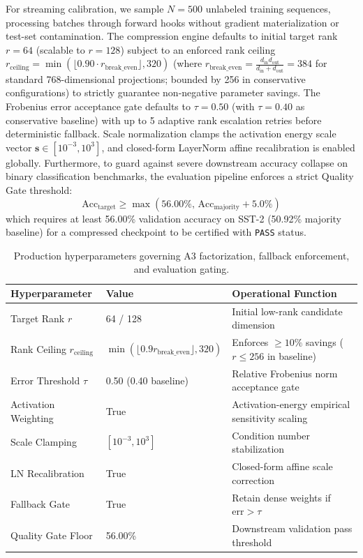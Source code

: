 For streaming calibration, we sample $N = 500$ unlabeled training sequences, processing batches through forward hooks without gradient materialization or test-set contamination. The compression engine defaults to initial target rank $r = 64$ (scalable to $r=128$) subject to an enforced rank ceiling $r_{\mathrm{ceiling}} = \min(\lfloor 0.90 \cdot r_{\mathrm{break\_even}}\rfloor, 320)$ (where $r_{\mathrm{break\_even}} = \frac{d_{\mathrm{in}} d_{\mathrm{out}}}{d_{\mathrm{in}} + d_{\mathrm{out}}} = 384$ for standard 768-dimensional projections; bounded by 256 in conservative configurations) to strictly guarantee non-negative parameter savings. The Frobenius error acceptance gate defaults to $\tau = 0.50$ (with $\tau = 0.40$ as conservative baseline) with up to 5 adaptive rank escalation retries before deterministic fallback. Scale normalization clamps the activation energy scale vector $\mathbf{s} \in [10^{-3}, 10^{3}]$, and closed-form LayerNorm affine recalibration is enabled globally. Furthermore, to guard against severe downstream accuracy collapse on binary classification benchmarks, the evaluation pipeline enforces a strict Quality Gate threshold:
\begin{equation}
\mathrm{Acc}_{\mathrm{target}} \ge \max(56.00\%,\, \mathrm{Acc}_{\mathrm{majority}} + 5.0\%)
\tag{6.1}
\end{equation}
which requires at least 56.00\% validation accuracy on SST-2 (50.92\% majority baseline) for a compressed checkpoint to be certified with \texttt{PASS} status.

\begin{table}[H]
\centering
\small
\begin{tabular}{lll}
\toprule
\textbf{Hyperparameter} & \textbf{Value} & \textbf{Operational Function} \\
\midrule
Target Rank $r$ & 64 / 128 & Initial low-rank candidate dimension \\
Rank Ceiling $r_{\mathrm{ceiling}}$ & $\min(\lfloor 0.9 r_{\mathrm{break\_even}}\rfloor, 320)$ & Enforces $\ge 10\%$ savings ($r \le 256$ in baseline) \\
Error Threshold $\tau$ & 0.50 (0.40 baseline) & Relative Frobenius norm acceptance gate \\
Activation Weighting & True & Activation-energy empirical sensitivity scaling \\
Scale Clamping & $[10^{-3}, 10^{3}]$ & Condition number stabilization \\
LN Recalibration & True & Closed-form affine scale correction \\
Fallback Gate & True & Retain dense weights if $\mathrm{err} > \tau$ \\
Quality Gate Floor & 56.00\% & Downstream validation pass threshold \\
\bottomrule
\end{tabular}
\caption{Production hyperparameters governing A3 factorization, fallback enforcement, and evaluation gating.}
\label{tab:a3_hyperparameters}
\end{table}

